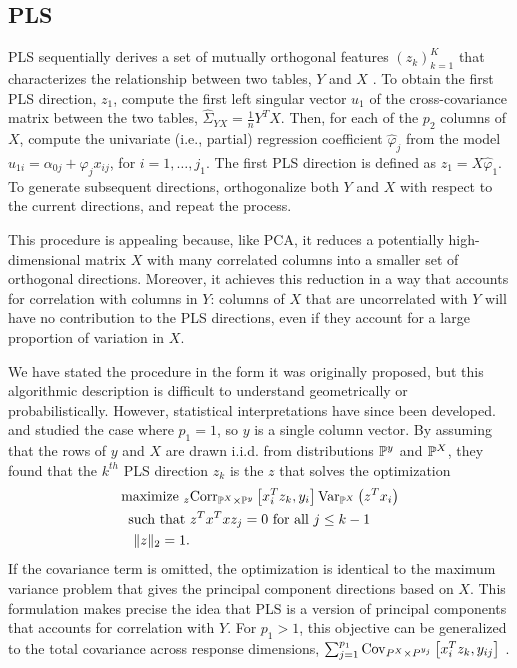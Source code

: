 \documentclass[14pt]{extarticle}
\begin{document}
\subsection{PLS}
\label{subsec:PLS}

PLS sequentially derives a set of mutually orthogonal features
$\left(z_{k}\right)_{k = 1}^{K}$ that characterizes the relationship between two
tables, $Y$ and $X$ \citep{wold1985partial}. To obtain the first PLS direction,
$z_{1}$, compute the first left singular vector $u_{1}$ of the cross-covariance
matrix between the two tables, $\hat{\Sigma}_{YX} = \frac{1}{n}Y^{T}X$. Then,
for each of the $p_{2}$ columns of $X$, compute the univariate (i.e., partial)
regression coefficient $\hat{\varphi}_{j}$ from the model $u_{1i} = \alpha_{0j}
+ \varphi_{j}x_{ij}$, for $i = 1, \dots, j_{1}$. The first PLS direction is
defined as $z_{1} = X\hat{\varphi}_{1}$. To generate subsequent directions,
orthogonalize both $Y$ and $X$ with respect to the current directions, and
repeat the process.

This procedure is appealing because, like PCA, it reduces a potentially
high-dimensional matrix $X$ with many correlated columns into a
smaller set of orthogonal directions. Moreover, it achieves this
reduction in a way that accounts for correlation with columns in
$Y$: columns of $X$ that are uncorrelated with $Y$
will have no contribution to the PLS directions, even if they account
for a large proportion of variation in $X$.

We have stated the procedure in the form it was originally proposed, but this
algorithmic description is difficult to understand geometrically or
probabilistically. However, statistical interpretations have since been
developed. \citep{frank1993statistical} and \citep{stone1990continuum} studied
the case where $p_{1} = 1$, so $y$ is a single column vector. By assuming that
the rows of $y$ and $X$ are drawn i.i.d. from distributions $\P^{y}$ and
$\P^{X}$, they found that the $k^{th}$ PLS direction $z_{k}$ is the $z$ that
solves the optimization
\begin{align}
  \label{eq:pls_obj}
\text{maximize }_{z} & \Corrsubarg{\P^{X} \times \P^{y}}{x_{i}^{T}z_{k},
y_{i}}\Varsubarg{\P^{X}}{z^{T}x_i} \\
\text{such that }&z^{T}x^{T}x z_{j} = 0 \text{ for all }j \nonumber
\leq k - 1 \nonumber \\
\|z\|_2 = 1. \nonumber
\end{align}
If the covariance term is omitted, the optimization is identical to the maximum
variance problem that gives the principal component directions based on $X$.
This formulation makes precise the idea that PLS is a version of principal
components that accounts for correlation with $Y$. For $p_1 > 1$, this objective
can be generalized to the total covariance across response dimensions, $\sum_{j
  = 1}^{p_1} \Covsubarg{P^X \times P^{y_j}}{x_i^T z_k, y_{ij}}$
\citep{chun2010sparse}.
\end{document}
